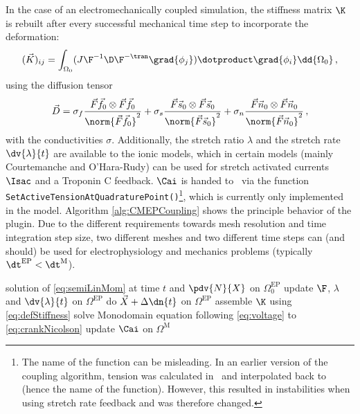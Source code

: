 In the case of an electromechanically coupled simulation, the stiffness matrix $\K$ is rebuilt after every successful mechanical time step to incorporate the deformation:
\begin{equation}
    (\vec K)_{ij} = \int_{\Omega_0} (J \F^{-1} \D \F^{-\tran} \grad{\phi_j}) \dotproduct \grad{\phi_i} \dd{\Omega_0} \,, \label{eq:defStiffness}
\end{equation}
using the diffusion tensor
\begin{equation}
    \vec D = \sigma_{f} \frac{\vec F \vec f_0 \otimes \vec F \vec f_0}{\norm{\vec F \vec f_0}^2} + \sigma_{ s} \frac{\vec F \vec s_0 \otimes \vec F \vec s_0}{\norm{\vec F \vec s_0}^2} + \sigma_{ n} \frac{\vec F \vec n_0 \otimes \vec F \vec n_0}{\norm{\vec F \vec n_0}^2} \,, 
\end{equation}
with the conductivities $\sigma$.
Additionally, the stretch ratio $\lambda$ and the stretch rate $\dv{\lambda}{t}$ are available to the ionic models, which in certain models (mainly Courtemanche and O'Hara-Rudy) can be used for stretch activated currents $\Isac$ and a Troponin C feedback.
$\Cai$ is handed to \CM~via the function \verb|SetActiveTensionAtQuadraturePoint()|\footnote{The name of the function can be misleading. In an earlier version of the coupling algorithm, tension was calculated in \ACC~and interpolated back to \CM (hence the name of the function). However, this resulted in instabilities when using stretch rate feedback and was therefore changed.}, which is currently only implemented in the  model.
Algorithm \autoref{alg:CMEPCoupling} shows the principle behavior of the plugin.
Due to the different requirements towards mesh resolution and time integration step size, two different meshes and two different time steps can (and should) be used for electrophysiology and mechanics problems (typically $\dt^\mathrm{EP} < \dt^\mathrm{M}$).

\begin{algorithm}
\caption{Staggered coupling of \CM~and \ACC}\label{alg:CMEPCoupling}
\begin{algorithmic}[1]
\Require solution of \eqref{eq:semiLinMom} at time $t$ and $\pdv{N}{X}$ on $\Omega^\mathrm{EP}_0$
\Repeat
\State update $\F$, $\lambda$ and $\dv{\lambda}{t}$ on $\Omega^\mathrm{EP}$
\State do $\vec X + \Delta \dn{t}$ on $\Omega^\mathrm{EP}$
\State assemble $\K$ using \eqref{eq:defStiffness}
\State solve Monodomain equation following \eqref{eq:voltage} to \eqref{eq:crankNicolson}
\State update $\Cai$ on $\Omega^\mathrm{M}$
\end{algorithmic}
\end{algorithm}

